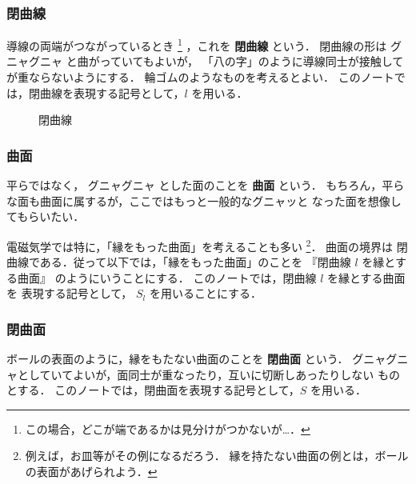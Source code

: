  \subsubsection{閉曲線}
    導線の両端がつながっているとき
    \footnote{
        この場合，どこが端であるかは見分けがつかないが…．
    }
    ，これを \textbf{閉曲線} という．
    閉曲線の形は    グニャグニャ と曲がっていてもよいが，
    「八の字」のように導線同士が接触してが重ならないようにする．
    輪ゴムのようなものを考えるとよい．
    このノートでは，閉曲線を表現する記号として，$l$ を用いる．

                \begin{figure}[hbt]
                    \begin{center}
                        \caption{閉曲線}
                        \label{fig:heikyokusenn}
                    \end{center}
                \end{figure}

 \subsubsection{曲面}
    平らではなく，  グニャグニャ とした面のことを \textbf{曲面} という．
    もちろん，平らな面も曲面に属するが，ここではもっと一般的なグニャッと
    なった面を想像してもらいたい．

    電磁気学では特に，「縁をもった曲面」を考えることも多い
        \footnote{
        例えば，お皿等がその例になるだろう．
        縁を持たない曲面の例とは，ボールの表面があげられよう．
        }．
    曲面の境界は
    閉曲線である．従って以下では，「縁をもった曲面」のことを
    『閉曲線 $l$ を縁とする曲面』
    のようにいうことにする．
    このノートでは，閉曲線 $l$ を縁とする曲面 を 表現する記号として，
    $S_{l}$ を用いることにする．

 \subsubsection{閉曲面}
    ボールの表面のように，縁をもたない曲面のことを \textbf{閉曲面} という．
    グニャグニャとしていてよいが，面同士が重なったり，互いに切断しあったりしない
    ものとする．    このノートでは，閉曲面を表現する記号として，$S$ を用いる．

